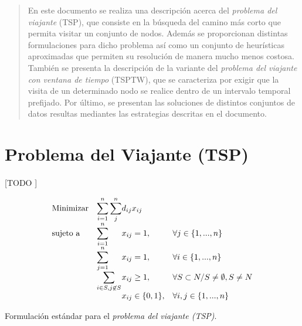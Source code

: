 \documentclass[spanish]{article}
\begin{document}
	\maketitle %

	\thispagestyle{fancy} %



	\begin{abstract}
		\noindent En este documento se realiza una descripción acerca del \emph{problema del viajante} (TSP), que consiste en la búsqueda del camino más corto que permita visitar un conjunto de nodos. Además se proporcionan distintas formulaciones para dicho problema así como un conjunto de heurísticas aproximadas que permiten su resolución de manera mucho menos costosa. También se presenta la descripción de la variante del \emph{problema del viajante con ventana de tiempo} (TSPTW), que se caracteriza por exigir que la visita de un determinado nodo se realice dentro de un intervalo temporal prefijado. Por último, se presentan las soluciones de distintos conjuntos de datos resultas mediantes las estrategias descritas en el documento.
	\end{abstract}


	\section{Problema del Viajante (TSP)}

		\paragraph{}
		[TODO ]

		\begin{eqfloat}
			\begin{equation}
				\begin{array}{ll@{}ll}
					\text{Minimizar}	& \displaystyle\sum\limits_{i = 1}^{n}\sum\limits_{j}^{n} & d_{ij}x_{ij} &\\
					\text{sujeto a}		& \displaystyle\sum\limits_{i = 1}^{n}	&	x_{ij} 	= 1,  & \forall j \in \{1,...,n\}\\
														& \displaystyle\sum\limits_{j = 1}^{n}	&	x_{ij} 	= 1,  & \forall i \in \{1,...,n\}\\
														& \displaystyle\sum\limits_{i \in S, j \not\in S}	&	x_{ij} 	\geq 1,  & \forall S \subset N / S \neq \emptyset, S \neq N \\
														&                               &	x_{ij} \in \{0,1\}, 	& \forall i,j \in \{1,...,n\}
				\end{array}
			\end{equation}
			\caption{Formulación estándar para el \emph{problema del viajante (TSP)}.}
			\label{eq:tsp_basic}
		\end{eqfloat}
\end{document}

